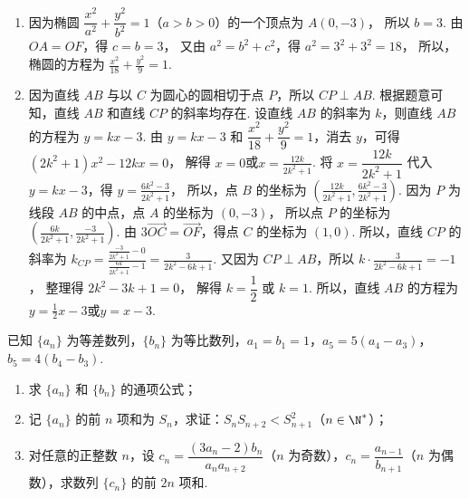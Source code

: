 \begin{solution}
\begin{enumerate}
\item 因为椭圆 \( \dfrac{x^2}{a^2}+\dfrac{y^2}{b^2}=1 \)（\( a>b>0 \)）的一个顶点为 \( A(0,-3) \)，
所以 \( b=3 \).
由 \( OA=OF \)，得 \( c=b=3 \)，
又由 \( a^2=b^2+c^2 \)，得
\(a^2=3^2+3^2=18\)，
所以，椭圆的方程为
\(\frac{x^2}{18}+\frac{y^2}{9}=1\).

\item 因为直线 \(AB\) 与以 \(C\) 为圆心的圆相切于点 \(P\)，所以 \( CP\perp AB \).
根据题意可知，直线 \(AB\) 和直线 \(CP\) 的斜率均存在. 设直线 \(AB\) 的斜率为 \( k \)，则直线 \(AB\) 的方程为
\(y=kx-3\).
由 \( y=kx-3 \) 和 \( \dfrac{x^2}{18}+\dfrac{y^2}{9}=1 \)，消去 \( y \)，可得
	\(\left( 2k^2+1 \right)x^2-12kx=0\)，
解得
\(x=0\)或\(x=\frac{12k}{2k^2+1}\).
将 \( x=\dfrac{12k}{2k^2+1} \) 代入 \( y=kx-3 \)，得
\(y=\frac{6k^2-3}{2k^2+1}\)，
所以，点 \(B\) 的坐标为
\(\left( \frac{12k}{2k^2+1},\frac{6k^2-3}{2k^2+1} \right)\).
因为 \(P\) 为线段 \(AB\) 的中点，点 \(A\) 的坐标为 \( (0,-3) \)，
所以点 \(P\) 的坐标为
\(\left( \frac{6k}{2k^2+1},\frac{-3}{2k^2+1} \right)\).
由 \( 3\overrightarrow{OC}=\overrightarrow{OF} \)，得点 \(C\) 的坐标为 \( (1,0) \).
所以，直线 \(CP\) 的斜率为
\(k_{CP} =\frac{\frac{-3}{2k^2+1}-0}{\frac{6k}{2k^2+1}-1} =\frac{3}{2k^2-6k+1}\).
又因为 \( CP\perp AB \)，所以
\(k\cdot\frac{3}{2k^2-6k+1}=-1\)，
整理得
\(2k^2-3k+1=0\)，
解得 \( k=\dfrac12 \) 或 \( k=1 \).
所以，直线 \(AB\) 的方程为
\(y=\frac12x-3\)或\(y=x-3\).
\end{enumerate}
\end{solution}

\begin{problem}
已知 \(\{a_n\}\) 为等差数列，\(\{b_n\}\) 为等比数列，\(a_1=b_1=1\)，\(a_5=5\left( a_4-a_3 \right)\)，\(b_5=4\left( b_4-b_3 \right)\).

\begin{enumerate}
\item 求 \(\{a_n\}\) 和 \(\{b_n\}\) 的通项公式；
\item 记 \(\{a_n\}\) 的前 \(n\) 项和为 \(S_n\)，求证：\(S_nS_{n+2}<S_{n+1}^2\)（\(n\in\N^*\)）；
\item 对任意的正整数 \(n\)，设 \(c_n=\dfrac{(3a_n-2)b_n}{a_na_{n+2}}\)（\(n\) 为奇数），\(c_n=\dfrac{a_{n-1}}{b_{n+1}}\)（\(n\) 为偶数），求数列 \(\{c_n\}\) 的前 \(2n\) 项和.
\end{enumerate}
\end{problem}

